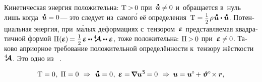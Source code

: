 \begin{otherlanguage}{russian}
\vspace{-0.1em} Кинетическая энергия положительна: ${\mathrm{T} \hspace{-0.2ex} > \hspace{-0.2ex} 0}$ при~${\mathdotabove{\bm{u}} \hspace{-0.1ex} \neq \hspace{-0.1ex} 0}$ и~обращается в~нуль лишь когда~${\mathdotabove{\bm{u}} = 0}$\:--- это следует из~самог\'{о} её определения~${\mathrm{T} = \smalldisplaystyleonehalf \hspace{.2ex} \rho \hspace{0.2ex} \mathdotabove{\bm{u}} \dotp \mathdotabove{\bm{u}}}$. Потенциальная энергия, при~м\'{а}лых деформациях с~тензором~$\mathboldepsilon$ представляемая квадратичной формой
${\Pi(\hspace{-0.1ex}\mathboldepsilon\hspace{-0.1ex}) \hspace{-0.2ex}=\hspace{0.1ex} \smash{\smalldisplaystyleonehalf} \hspace{.25ex} \mathboldepsilon \hspace{-0.1ex} \dotdotp \hspace{-0.1ex} \stiffnesstensor \dotdotp \mathboldepsilon}$, тоже положительна: ${\Pi \hspace{-0.16ex} > \hspace{-0.2ex} 0}$ при~${\mathboldepsilon \hspace{-0.1ex} \neq \hspace{-0.1ex} 0}$. Таково априорное требование положительной определённости к~тензору жёсткости~$\hspace{.08ex}{^4\hspace{-0.72ex}\bm{\mathcal{A}}}\hspace{.08ex}$. Это одно из ~\cite{lurie-nonlinearelasticity, truesdell-firstcourse}.



\nopagebreak\vspace{-0.16em}\begin{equation*}
\mathrm{T} = 0 \hspace{.1ex}, \; \Pi = 0
\:\,\Rightarrow\,\:
\mathdotabove{\bm{u}} = 0 \hspace{.1ex}, \; \mathboldepsilon = \hspace{-0.25ex} \boldnabla {\bm{u}}^{\hspace{0.1ex}\mathsf{S}} \hspace{-0.2ex} = 0
\:\,\Rightarrow\:
\bm{u} = \bm{u}^{\hspace{-0.1ex}\circ} \hspace{-0.25ex} + \hspace{.1ex} \bm{\vartheta}^{\circ} \hspace{-0.4ex} \times \bm{r} ,
\end{equation*}


\end{otherlanguage}
